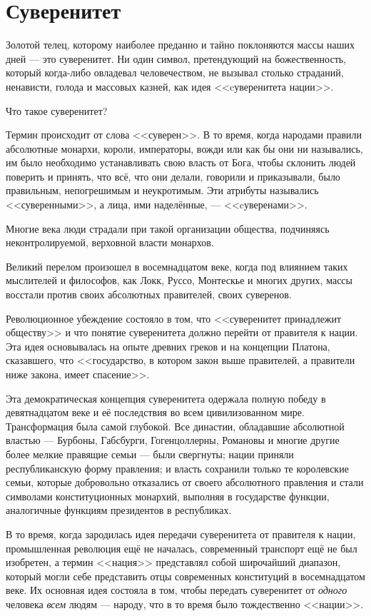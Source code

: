 \chapter{Суверенитет}

Золотой телец, которому наиболее преданно и тайно поклоняются массы наших дней — это суверенитет. Ни один символ, претендующий на божественность, который когда-либо овладевал человечеством, не вызывал столько страданий, ненависти, голода и массовых казней, как идея <<cуверенитета нации>>.
 
Что такое суверенитет?

Термин происходит от слова <<суверен>>. В то время, когда народами правили абсолютные монархи, короли, императоры, вожди или как бы они ни назывались, им было необходимо устанавливать свою власть от Бога, чтобы склонить людей поверить и принять, что всё, что они делали, говорили и приказывали, было правильным, непогрешимым и неукротимым. Эти атрибуты назывались <<суверенными>>, а лица, ими наделённые, — <<cуверенами>>.

Многие века люди страдали при такой организации общества, подчиняясь неконтролируемой, верховной власти монархов.

Великий перелом произошел в восемнадцатом веке, когда под влиянием таких мыслителей и философов, как Локк, Руссо, Монтескье и многих других, массы восстали против своих абсолютных правителей, своих суверенов.

Революционное убеждение состояло в том, что <<суверенитет принадлежит обществу>> и что понятие суверенитета должно перейти от правителя к нации. Эта идея основывалась на опыте древних греков и на концепции Платона, сказавшего, что <<государство, в котором закон выше правителей, а правители ниже закона, имеет спасение>>.

Эта демократическая концепция суверенитета одержала полную победу в девятнадцатом веке и её последствия во всем цивилизованном мире. Трансформация была самой глубокой. Все династии, обладавшие абсолютной властью — Бурбоны, Габсбурги, Гогенцоллерны, Романовы и многие другие более мелкие правящие семьи — были свергнуты; нации приняли республиканскую форму правления; и власть сохранили только те королевские семьи, которые добровольно отказались от своего абсолютного правления и стали символами конституционных монархий, выполняя в государстве функции, аналогичные функциям президентов в республиках.

В то время, когда зародилась идея передачи суверенитета от правителя к нации, промышленная революция ещё не началась, современный транспорт ещё не был изобретен, а термин <<нация>> представлял собой широчайший диапазон, который могли себе представить отцы современных конституций в восемнадцатом веке. Их основная идея состояла в том, чтобы передать суверенитет от \textit{одного} человека \textit{всем} людям — народу, что в то время было тождественно <<нации>>.

